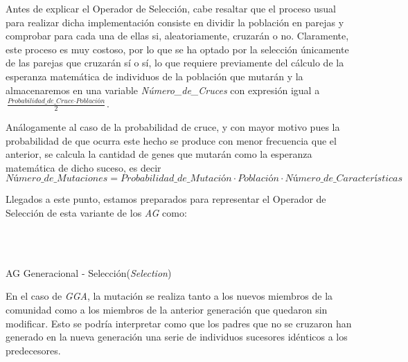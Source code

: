\documentclass[a4paper, 11pt]{article}
\begin{document}
			Antes de explicar el Operador de Selección, cabe resaltar que el proceso usual para realizar
			dicha implementación consiste en dividir la población en parejas y comprobar para cada una
			de ellas si, aleatoriamente, cruzarán o no. Claramente, este proceso es muy costoso, por lo
			que se ha optado por la selección únicamente de las parejas que cruzarán sí o sí, lo que
			requiere previamente del cálculo de la esperanza matemática de individuos de la población
			que mutarán y la almacenaremos en una variable \textit{Número\_de\_Cruces} con expresión
			igual a $\displaystyle \frac{\textit{Probabilidad\_de\_Cruce} \cdot \textit{Población}}{2}$.
			
			Análogamente al caso de la probabilidad de cruce, y con mayor motivo pues la probabilidad
			de que ocurra este hecho se produce con menor frecuencia que el anterior, se calcula la
			cantidad de genes que mutarán como la esperanza matemática de dicho suceso, es decir
			$\textit{Número\_de\_Mutaciones} = \textit{Probabilidad\_de\_Mutación} \cdot \textit{Población}
			\cdot \textit{Número\_de\_Características}$
			
			Llegados a este punto, estamos preparados para representar el Operador de Selección de
			esta variante de los \textit{AG} como:
			
			\begin{algorithm}[H]
				\begin{algorithmic}[1]
				\REQUIRE \ \\
						 \
						
					\ENDIF
				\ENDWHILE
				
				\end{algorithmic}
			\caption{AG Generacional - Selección(\textit{Selection})}
			\label{GGA-Selec}
			\end{algorithm}
			
			En el caso de \textit{GGA}, la mutación se realiza tanto a los nuevos miembros de la comunidad
			como a los miembros de la anterior generación que quedaron sin modificar. Esto se podría
			interpretar como que los padres que no se cruzaron han generado en la nueva generación
			una serie de individuos sucesores idénticos a los predecesores.
			
\end{document}
